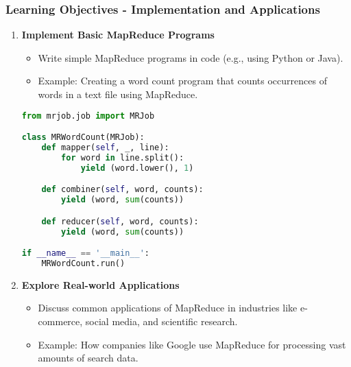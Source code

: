 \documentclass[aspectratio=169]{beamer}
\begin{document}
\begin{frame}[fragile]
    \frametitle{Learning Objectives - Implementation and Applications}
    \begin{enumerate}    
        \item \textbf{Implement Basic MapReduce Programs}
        \begin{itemize}
            \item Write simple MapReduce programs in code (e.g., using Python or Java).
            \item Example: Creating a word count program that counts occurrences of words in a text file using MapReduce.
        \end{itemize}
        
        \begin{lstlisting}[language=python]
from mrjob.job import MRJob

class MRWordCount(MRJob):
    def mapper(self, _, line):
        for word in line.split():
            yield (word.lower(), 1)

    def combiner(self, word, counts):
        yield (word, sum(counts))

    def reducer(self, word, counts):
        yield (word, sum(counts))

if __name__ == '__main__':
    MRWordCount.run()
        \end{lstlisting}

        \item \textbf{Explore Real-world Applications}
        \begin{itemize}
            \item Discuss common applications of MapReduce in industries like e-commerce, social media, and scientific research.
            \item Example: How companies like Google use MapReduce for processing vast amounts of search data.
        \end{itemize}
    \end{enumerate}
\end{frame}
\end{document}

